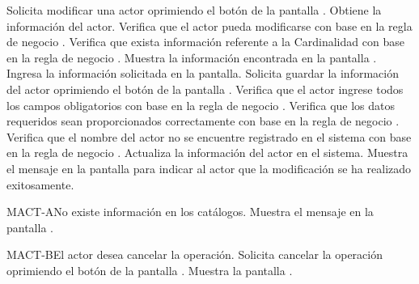 	\begin{UCtrayectoria}
		\UCpaso[\UCactor] Solicita modificar una actor oprimiendo el botón \editar de la pantalla .
		\UCpaso[\UCsist] Obtiene la información del actor.
		\UCpaso[\UCsist] Verifica que el actor pueda modificarse con base en la regla de negocio . 
		\UCpaso[\UCactor] Verifica que exista información referente a la Cardinalidad con base en la regla de negocio . 
		\UCpaso[\UCsist] Muestra la información encontrada en la  pantalla .
		\UCpaso[\UCactor] Ingresa la información solicitada en la pantalla. \label{CU10.2-P6}
		\UCpaso[\UCactor] Solicita guardar la información del actor oprimiendo el botón  de la pantalla .  
		\UCpaso[\UCsist] Verifica que el actor ingrese todos los campos obligatorios con base en la regla de negocio . 
		\UCpaso[\UCsist] Verifica que los datos requeridos sean proporcionados correctamente con base en la regla de negocio .  
		\UCpaso[\UCsist] Verifica que el nombre del actor no se encuentre registrado en el sistema con base en la regla de negocio .  
		\UCpaso[\UCsist] Actualiza la información del actor en el sistema.
		\UCpaso[\UCsist] Muestra el mensaje  en la pantalla  para indicar al actor que la modificación se ha realizado exitosamente.
	\end{UCtrayectoria}		
	
	\begin{UCtrayectoriaA}{MACT-A}{No existe información en los catálogos.}
		\UCpaso[\UCactor] Muestra el mensaje  en la pantalla .
	\end{UCtrayectoriaA}

	\begin{UCtrayectoriaA}{MACT-B}{El actor desea cancelar la operación.}
		\UCpaso[\UCactor] Solicita cancelar la operación oprimiendo el botón  de la pantalla .
		\UCpaso[\UCsist] Muestra la pantalla .
	\end{UCtrayectoriaA}

